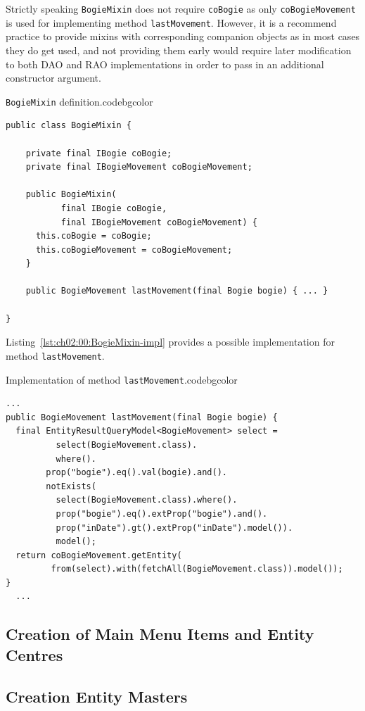   Strictly speaking \texttt{BogieMixin} does not require \texttt{coBogie} as only \texttt{coBogieMovement} is used for implementing method \texttt{lastMovement}.
  However, it is a recommend practice to provide mixins with corresponding companion objects as in most cases they do get used, and not providing them early would require later modification to both DAO and RAO implementations in order to pass in an additional constructor argument.
  
    \begin{code}{\texttt{BogieMixin} definition.}{\label{lst:ch02:00:BogieMixin-def}}{codebgcolor}
    \begin{lstlisting}
public class BogieMixin {

    private final IBogie coBogie; 
    private final IBogieMovement coBogieMovement; 

    public BogieMixin(
           final IBogie coBogie,
           final IBogieMovement coBogieMovement) {
      this.coBogie = coBogie;
      this.coBogieMovement = coBogieMovement;
    }
    
    public BogieMovement lastMovement(final Bogie bogie) { ... }
    
}
    \end{lstlisting}
  \end{code}
  
  Listing~\ref{lst:ch02:00:BogieMixin-impl} provides a possible implementation for method \texttt{lastMovement}.
  
  \begin{code}{Implementation of method \texttt{lastMovement}.}{\label{lst:ch02:00:BogieMixin-impl}}{codebgcolor}
  \begin{lstlisting}
...
public BogieMovement lastMovement(final Bogie bogie) { 
  final EntityResultQueryModel<BogieMovement> select = 
	      select(BogieMovement.class).
	      where().
		prop("bogie").eq().val(bogie).and().
		notExists(
		  select(BogieMovement.class).where().
		  prop("bogie").eq().extProp("bogie").and().
		  prop("inDate").gt().extProp("inDate").model()).
	      model();
  return coBogieMovement.getEntity(
         from(select).with(fetchAll(BogieMovement.class)).model());    
}
  ...
  \end{lstlisting}
\end{code}
  
  \subsection{Creation of Main Menu Items and Entity Centres}
  
  
  \subsection{Creation Entity Masters}
  
